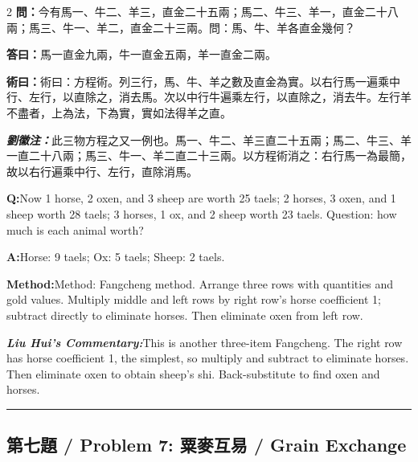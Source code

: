 \documentclass[11pt,a4paper]{article}
\newcommand{\cnwen}{\textcolor{cnlabelfg}{\textbf{問：}}}
\newcommand{\cnda}{\textbf{答曰：}}
\newcommand{\cnshu}{\textcolor{cnlabelfg}{\textbf{術曰：}}}
\newcommand{\cnzhu}{\textcolor{commentarycolor}{\textit{\textbf{劉徽注：}}}}
\newcommand{\enwen}{\textcolor{enlabelfg}{\textbf{Q:}}}
\newcommand{\enda}{\textcolor{enlabelfg}{\textbf{A:}}}
\newcommand{\enshu}{\textcolor{enlabelfg}{\textbf{Method:}}}
\newcommand{\enzhu}{\textcolor{enlabelfg}{\textit{\textbf{Liu Hui's Commentary:}}}}
\begin{document}
\begin{paracol}{2}
\switchcolumn[0]
\cnwen 今有馬一、牛二、羊三，直金二十五兩；馬二、牛三、羊一，直金二十八兩；馬三、牛一、羊二，直金二十三兩。問：馬、牛、羊各直金幾何？

\cnda 馬一直金九兩，牛一直金五兩，羊一直金二兩。

\cnshu 術曰：方程術。列三行，馬、牛、羊之數及直金為實。以右行馬一遍乘中行、左行，以直除之，消去馬。次以中行牛遍乘左行，以直除之，消去牛。左行羊不盡者，上為法，下為實，實如法得羊之直。

\cnzhu 此三物方程之又一例也。馬一、牛二、羊三直二十五兩；馬二、牛三、羊一直二十八兩；馬三、牛一、羊二直二十三兩。以方程術消之：右行馬一為最簡，故以右行遍乘中行、左行，直除消馬。

\switchcolumn[1]
\enwen Now 1 horse, 2 oxen, and 3 sheep are worth 25 taels; 2 horses, 3 oxen, and 1 sheep worth 28 taels; 3 horses, 1 ox, and 2 sheep worth 23 taels. Question: how much is each animal worth?

\enda Horse: 9 taels; Ox: 5 taels; Sheep: 2 taels.

\enshu Method: Fangcheng method. Arrange three rows with quantities and gold values. Multiply middle and left rows by right row's horse coefficient 1; subtract directly to eliminate horses. Then eliminate oxen from left row.

\enzhu This is another three-item Fangcheng. The right row has horse coefficient 1, the simplest, so multiply and subtract to eliminate horses. Then eliminate oxen to obtain sheep's shi. Back-substitute to find oxen and horses.
\end{paracol}

\bigskip\hrule\bigskip

\subsection{第七題 / Problem 7: 粟麥互易 / Grain Exchange}
\end{document}
